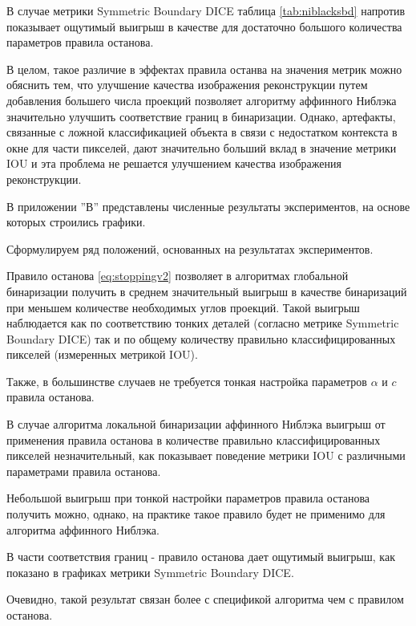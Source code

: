 В случае метрики Symmetric Boundary DICE таблица \ref*{tab:niblacksbd} напротив показывает ощутимый выигрыш в качестве для достаточно большого количества параметров правила останова.

В целом, такое различие в эффектах правила останва на значения метрик можно обяснить тем, что улучшение качества изображения реконструкции путем добавления большего числа проекций позволяет алгоритму аффинного Ниблэка значительно улучшить соответствие границ в бинаризации. Однако, артефакты, связанные с ложной классификацией объекта в связи с недостатком контекста в окне для части пикселей, дают значительно больший вклад в значение метрики IOU и эта проблема не решается улучшением качества изображения реконструкции.

В приложении ''В'' представлены численные результаты экспериментов, на основе которых строились графики.

Сформулируем ряд положений, основанных на результатах экспериментов.

Правило останова \ref*{eq:stoppingv2} позволяет в алгоритмах глобальной бинаризации получить в среднем значительный выигрыш в качестве бинаризаций при меньшем количестве необходимых углов проекций. Такой выигрыш наблюдается как по соответствию тонких деталей (согласно метрике Symmetric Boundary DICE) так и по общему количеству правильно классифицированных пикселей (измеренных метрикой IOU).

Также, в большинстве случаев не требуется тонкая настройка параметров \(\alpha\) и \(c\) правила останова.

В случае алгоритма локальной бинаризации аффинного Ниблэка выигрыш от применения правила останова в количестве правильно классифицированных пикселей незначительный, как показывает поведение метрики IOU с различными параметрами правила останова.

Небольшой выигрыш при тонкой настройки параметров правила останова получить можно, однако, на практике такое правило будет не применимо для алгоритма аффинного Ниблэка.

В части соответствия границ - правило останова дает ощутимый выигрыш, как показано в графиках метрики Symmetric Boundary DICE.

Очевидно, такой результат связан более с спецификой алгоритма чем с правилом останова.